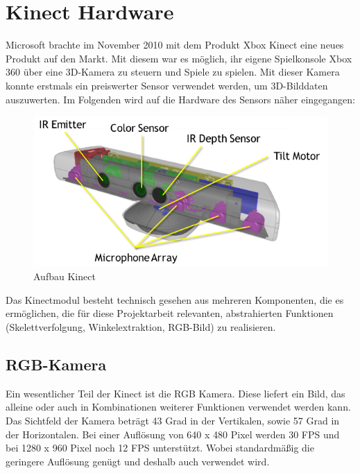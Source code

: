 \section{Kinect Hardware}
Microsoft brachte im November 2010 mit dem Produkt Xbox Kinect eine neues Produkt auf den Markt. Mit diesem war es möglich, ihr eigene Spielkonsole Xbox 360 über eine 3D-Kamera zu steuern und Spiele zu spielen. 
Mit dieser Kamera konnte erstmals ein preiswerter Sensor verwendet werden, um 3D-Bilddaten auszuwerten.
Im Folgenden wird auf die Hardware des Sensors näher eingegangen:\\[0.2cm]

\begin{figure}[H]						
	\centering							
	\includegraphics[scale=0.9]{Bilder/kinect_sensor_aufbau.png}			
	\caption{Aufbau Kinect\cite{ws:microsoft_kinect}}						
	\label{f:kinect_hardware}						
\end{figure}

\noindent
Das Kinectmodul besteht technisch gesehen aus mehreren Komponenten, die es ermöglichen, die
für diese Projektarbeit relevanten, abstrahierten Funktionen (Skelettverfolgung, Winkelextraktion, RGB-Bild)
zu realisieren. \cite{webb2012beginning}

\subsection{RGB-Kamera}

	Ein wesentlicher Teil der Kinect ist die RGB Kamera. Diese liefert ein Bild, das alleine
	oder auch in Kombinationen weiterer Funktionen verwendet werden kann.
	Das Sichtfeld der Kamera beträgt 43 Grad in der Vertikalen, sowie 57 Grad in der Horizontalen.
	Bei einer Auflösung von 640 x 480 Pixel werden 30 \ac{FPS} und bei 1280 x 960 Pixel noch 12 \ac{FPS} unterstützt.
	Wobei standardmäßig die geringere Auflösung genügt und deshalb auch verwendet wird.
	\cite{jana2012kinect}	

